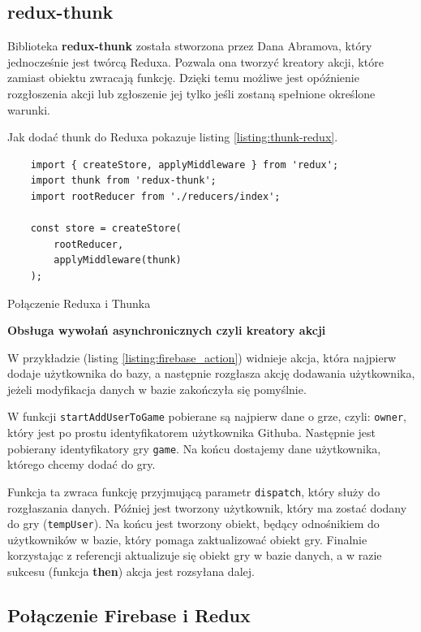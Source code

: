 \subsection{redux-thunk}

Biblioteka \textbf{redux-thunk} została stworzona przez Dana Abramova,
który jednocześnie jest twórcą Reduxa. Pozwala ona tworzyć kreatory akcji,
które zamiast obiektu zwracają funkcję.
Dzięki temu możliwe jest opóźnienie rozgłoszenia akcji lub zgłoszenie jej tylko
jeśli zostaną spełnione określone warunki. \cite{www_thunk}

Jak dodać thunk do Reduxa pokazuje listing \ref{listing:thunk-redux}.

\begin{listing}
\begin{verbatim}
    import { createStore, applyMiddleware } from 'redux';
    import thunk from 'redux-thunk';
    import rootReducer from './reducers/index';

    const store = createStore(
        rootReducer,
        applyMiddleware(thunk)
    );
\end{verbatim}
\caption{Połączenie Reduxa i Thunka} \label{listing:thunk-redux}
\end{listing}

\begin{center}
	\textbf{Obsługa wywołań asynchronicznych czyli kreatory akcji}
\end{center}

W przykładzie (listing \ref{listing:firebase_action}) widnieje akcja,
która najpierw dodaje użytkownika do bazy, a następnie rozgłasza akcję dodawania użytkownika,
jeżeli modyfikacja danych w bazie zakończyła się pomyślnie.

W funkcji \texttt{startAddUserToGame} pobierane są najpierw dane o grze, czyli: \texttt{owner},
który jest po prostu identyfikatorem użytkownika Githuba.
Następnie jest pobierany identyfikatory gry \texttt{game}.
Na końcu dostajemy dane użytkownika, którego chcemy dodać do gry.

Funkcja ta zwraca funkcję przyjmującą parametr \texttt{dispatch},
który służy do rozgłaszania danych.
Później jest tworzony użytkownik, który ma zostać dodany do gry (\texttt{tempUser}).
Na końcu jest tworzony obiekt, będący odnośnikiem do użytkowników w bazie,
który pomaga zaktualizować obiekt gry.
Finalnie korzystając z referencji aktualizuje się obiekt gry w bazie danych,
a w razie sukcesu (funkcja \textbf{then}) akcja jest rozsyłana dalej.

\subsection{Połączenie Firebase i Redux}

